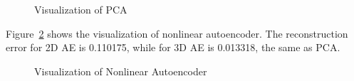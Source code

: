 \documentclass{article}
\begin{document}
\begin{figure}[H]
    \centering
    \caption{Visualization of PCA}
    \label{Figure 1}
\end{figure}

Figure~\ref{Figure 2} shows the visualization of nonlinear autoencoder. The reconstruction error for 2D AE is 0.110175, while for 3D AE is 0.013318, the same as PCA.

\begin{figure}[H]
    \centering
    \caption{Visualization of Nonlinear Autoencoder}
    \label{Figure 2}
\end{figure}
\end{document}
